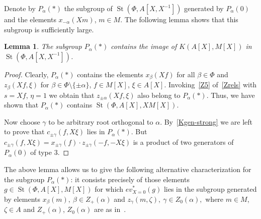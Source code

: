 \documentclass[oneside, 8pt]{amsart}
\newtheorem{lemma}{Lemma}
\theoremstyle{remark}
\theoremstyle{definition}
\DeclareMathOperator{\St}{St}
\numberwithin{equation}{section}
\begin{document}
Denote by $P_\alpha(*)$ the subgroup of $\St(\Phi, A[X, X^{-1}])$ generated by $P_\alpha(0)$ and the elements $x_{-\alpha}(Xm)$, $m \in M$. The following lemma shows that this subgroup is sufficiently large.
\begin{lemma} \label{Pstar-large} The subgroup $P_\alpha(*)$ contains the image of $K(A[X], M[X])$ in $\St(\Phi, A[X, X^{-1}])$. \end{lemma}
\begin{proof} Clearly, $P_\alpha(*)$ contains the elements $x_\beta(Xf)$ for all $\beta \in \Phi$ and $z_\beta(Xf, \xi)$ for $\beta \in \Phi \setminus \{\pm \alpha\}$, $f \in M[X]$, $\xi\in A[X]$. 
Invoking~\eqref{Z5} of~\cref{Zrels} with $s = Xf$, $\eta = 1$ we obtain that $z_{\pm\alpha}(Xf, \xi)$ also belong to $P_{\alpha}(*)$. Thus, we have shown that $P_\alpha(*)$ contains $\St(\Phi, A[X], XM[X])$.

Now choose $\gamma$ to be arbitrary root orthogonal to $\alpha$. By~\cref{Kgen-strong} we are left to prove that $c_{\pm \gamma}(f, X\xi)$ lies in $P_\alpha(*)$. 
But $c_{\pm \gamma}(f, X\xi) = x_{\pm \gamma}(f) \cdot z_{\pm \gamma}(-f, -X\xi)$ is a product of two generators of $P_\alpha(0)$ of type 3. \end{proof}

The above lemma allows us to give the following alternative characterization for the subgroup $P_\alpha(*)$:
 it consists precisely of those elements $g \in \St(\Phi, A[X], M[X])$ for which $ev_{X=0}^*(g)$ lies in the subgroup generated by
 elements $x_{\beta}(m),\ \beta \in Z_+(\alpha)$ and $z_{\gamma}(m, \zeta),\ \gamma \in Z_0(\alpha),$ where $m \in M$, $\zeta \in A$ 
 and $Z_+(\alpha)$, $Z_0(\alpha)$ are as in~\cite[Proposition~5.7]{St71}.
   
\end{document}
